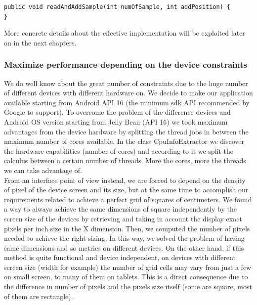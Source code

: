 \begin{lstlisting}
public void readAndAddSample(int numOfSample, int addPosition) {
}
\end{lstlisting}
More concrete details about the effective implementation will be exploited later on in the next chapters.

\subsubsection{Maximize performance depending on the device constraints}
We do well know about the great number of constraints due to the huge number of different devices with different hardware on. We decide to make our application available starting from Android API 16 (the minimum sdk API recommended by Google to support).  To overcome the problem of the difference devices and Android OS version starting from Jelly Bean (API 16) we took maximum advantages from the device hardware by splitting the thread jobs in between the maximum number of cores available. In the class CpuInfoExtractor we discover the hardware capabilities (number of cores) and according to it we split the calculus between a certain number of threads. More the cores, more the threads we can take advantage of.\\
From an interface point of view instead, we are forced  to depend on the density of pixel of the device screen and its size, but at the same time to accomplish our requirements related to achieve a perfect grid of squares of centimeters. We found a way to always achieve the same dimensions of square independently by the screen size of the devices by retrieving and taking in account the display exact pixels per inch size in the X dimension. Then, we computed the number of pixels needed to achieve the right sizing.  In this way, we solved the problem of having same dimensions and so metrics on different devices. On the other hand, if this method is quite functional and device independent, on devices with different screen size (width for example) the number of grid cells may vary from just a few on small screen, to many of them on tablets. This is a direct consequence due to the difference in number of pixels and the pixels size itself (some are square, most of them are rectangle).\\

